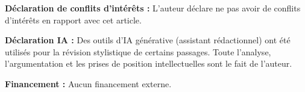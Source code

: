 \documentclass[12pt,a4paper]{article}
\begin{document}
\begin{center}
\vspace{2cm}

\textbf{Déclaration de conflits d'intérêts :} L'auteur déclare ne pas avoir de conflits d'intérêts en rapport avec cet article.

\vspace{1em}

\textbf{Déclaration IA :} Des outils d'IA générative (assistant rédactionnel) ont été utilisés pour la révision stylistique de certains passages. Toute l'analyse, l'argumentation et les prises de position intellectuelles sont le fait de l'auteur.

\vspace{1em}

\textbf{Financement :} Aucun financement externe.

\end{center}
\end{document}
